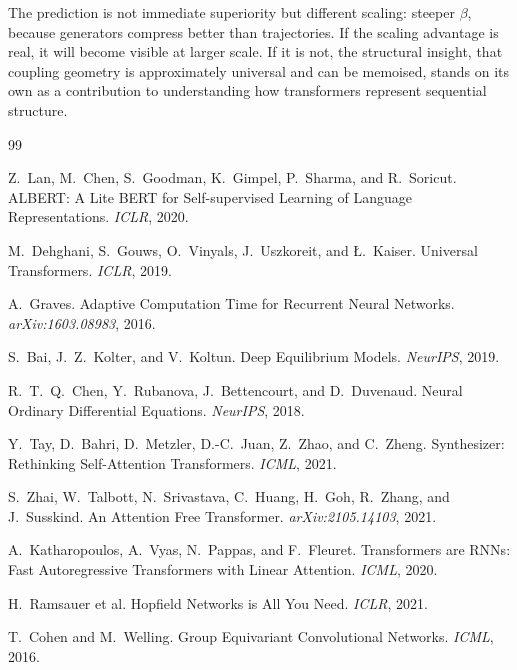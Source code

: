 \documentclass[11pt, a4paper]{article}
\theoremstyle{remark}
\begin{document}
The prediction is not immediate superiority but different scaling: steeper $\beta$, because generators compress better than trajectories.
If the scaling advantage is real, it will become visible at larger scale.
If it is not, the structural insight, that coupling geometry is approximately universal and can be memoised, stands on its own as a contribution to understanding how transformers represent sequential structure.


\begin{thebibliography}{99}

Z.~Lan, M.~Chen, S.~Goodman, K.~Gimpel, P.~Sharma, and R.~Soricut.
\newblock ALBERT: A Lite BERT for Self-supervised Learning of Language Representations.
\newblock \emph{ICLR}, 2020.

M.~Dehghani, S.~Gouws, O.~Vinyals, J.~Uszkoreit, and {\L}.~Kaiser.
\newblock Universal Transformers.
\newblock \emph{ICLR}, 2019.

A.~Graves.
\newblock Adaptive Computation Time for Recurrent Neural Networks.
\newblock \emph{arXiv:1603.08983}, 2016.

S.~Bai, J.~Z.~Kolter, and V.~Koltun.
\newblock Deep Equilibrium Models.
\newblock \emph{NeurIPS}, 2019.

R.~T.~Q.~Chen, Y.~Rubanova, J.~Bettencourt, and D.~Duvenaud.
\newblock Neural Ordinary Differential Equations.
\newblock \emph{NeurIPS}, 2018.

Y.~Tay, D.~Bahri, D.~Metzler, D.-C.~Juan, Z.~Zhao, and C.~Zheng.
\newblock Synthesizer: Rethinking Self-Attention Transformers.
\newblock \emph{ICML}, 2021.

S.~Zhai, W.~Talbott, N.~Srivastava, C.~Huang, H.~Goh, R.~Zhang, and J.~Susskind.
\newblock An Attention Free Transformer.
\newblock \emph{arXiv:2105.14103}, 2021.

A.~Katharopoulos, A.~Vyas, N.~Pappas, and F.~Fleuret.
\newblock Transformers are RNNs: Fast Autoregressive Transformers with Linear Attention.
\newblock \emph{ICML}, 2020.

H.~Ramsauer et al.
\newblock Hopfield Networks is All You Need.
\newblock \emph{ICLR}, 2021.

T.~Cohen and M.~Welling.
\newblock Group Equivariant Convolutional Networks.
\newblock \emph{ICML}, 2016.


\end{thebibliography}
\end{document}
